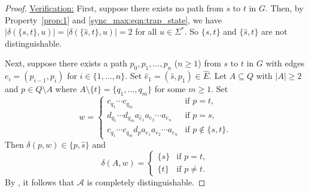\begin{proof}
	\medskip 
	\noindent\underline{Verification:}	
	First, suppose there exists no path from $s$ to $t$ in $G$.
	Then, by Property~\ref{prop:1} and \cref{sync_max:eqn:trap_state}, 
	we have $|\delta(\{s, t\}, u)| = |\delta(\{\hat{s}, t\}, u)| = 2$
	for all $u \in \Sigma^*$. So $\{s, t\}$ and $\{\hat s, t\}$
	are not distinguishable.
	
	Next, suppose there exists a path $p_0, p_1, \ldots, p_n$ ($n \ge 1$)
	from $s$ to $t$ in $G$
	with edges $e_i = (p_{i-1}, p_i)$
	for $i \in \{1,\ldots,n\}$.  Set $\hat{e}_1 = (\hat{s}, p_1) \in \hat{E}$.
	Let $A \subseteq Q$ with $|A| \ge 2$ 
	and $p \in Q \setminus A$
	where $A \setminus \{t\} = \{q_1, \ldots, q_m\}$ for some $m \ge 1$.
	Set
	\[
	w = \begin{cases}
		c_{q_1} \cdots c_{q_m} & \text{if }  p = t, \\
		d_{q_1} \cdots d_{q_m} a_{\hat{e}_1} a_{e_2} \cdots a_{e_n} & \text{if } p = s,	\\
		c_{q_1} \cdots c_{q_m} d_{p} a_{e_1} a_{e_2} \cdots a_{e_n} & \text{if } p \notin \{s, t\}.
	\end{cases}
	\]
	Then $\delta(p, w) \in \{ p, \hat{s} \}$
	and
	\[
	\delta(A, w) = \begin{cases}
		\{s\} & \text{if } p = t, \\
		\{t\} & \text{if } p \ne t.
	\end{cases}
	\]
	By ,
	it follows that $\mathcal A$
	is completely distinguishable.
\end{proof}



